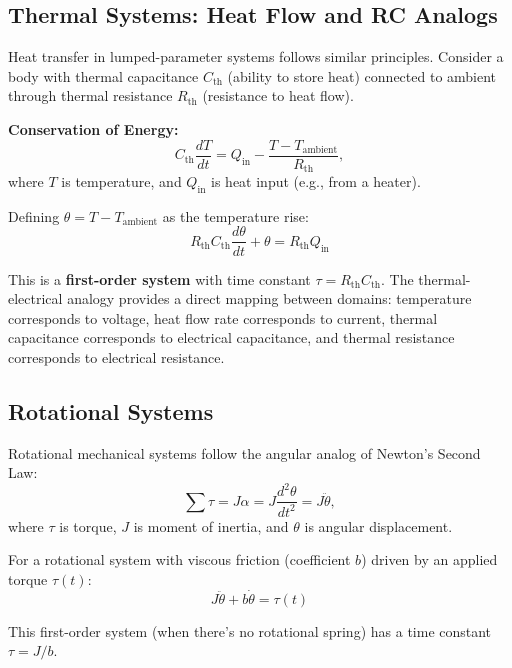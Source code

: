 \subsection{Thermal Systems: Heat Flow and RC Analogs}

Heat transfer in lumped-parameter systems follows similar principles. Consider a body with thermal capacitance $C_{\text{th}}$ (ability to store heat) connected to ambient through thermal resistance $R_{\text{th}}$ (resistance to heat flow).

\textbf{Conservation of Energy:}
\begin{equation}
C_{\text{th}}\frac{dT}{dt} = Q_{\text{in}} - \frac{T - T_{\text{ambient}}}{R_{\text{th}}},
\end{equation}
where $T$ is temperature, and $Q_{\text{in}}$ is heat input (e.g., from a heater).

Defining $\theta = T - T_{\text{ambient}}$ as the temperature rise:
\begin{equation}
\boxed{R_{\text{th}}C_{\text{th}}\frac{d\theta}{dt} + \theta = R_{\text{th}}Q_{\text{in}}}
\label{eq:thermal}
\end{equation}

This is a \textbf{first-order system} with time constant $\tau = R_{\text{th}}C_{\text{th}}$. The thermal-electrical analogy provides a direct mapping between domains: temperature corresponds to voltage, heat flow rate corresponds to current, thermal capacitance corresponds to electrical capacitance, and thermal resistance corresponds to electrical resistance.

\subsection{Rotational Systems}

Rotational mechanical systems follow the angular analog of Newton's Second Law:
\begin{equation}
\sum \tau = J\alpha = J\frac{d^2\theta}{dt^2} = J\ddot{\theta},
\end{equation}
where $\tau$ is torque, $J$ is moment of inertia, and $\theta$ is angular displacement.

For a rotational system with viscous friction (coefficient $b$) driven by an applied torque $\tau(t)$:
\begin{equation}
\boxed{J\ddot{\theta} + b\dot{\theta} = \tau(t)}
\label{eq:rotational}
\end{equation}

This first-order system (when there's no rotational spring) has a time constant $\tau = J/b$.

